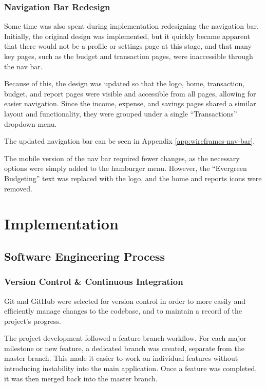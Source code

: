 \documentclass{l4proj}
\begin{document}
\subsection{Navigation Bar Redesign}
Some time was also spent during implementation redesigning the navigation bar. Initially, the original design was implemented, but it quickly became apparent that there would not be a profile or settings page at this stage, and that many key pages, such as the budget and transaction pages, were inaccessible through the nav bar.

Because of this, the design was updated so that the logo, home, transaction, budget, and report pages were visible and accessible from all pages, allowing for easier navigation. Since the income, expense, and savings pages shared a similar layout and functionality, they were grouped under a single “Transactions” dropdown menu.

The updated navigation bar can be seen in Appendix \ref{app:wireframes-nav-bar}.

The mobile version of the nav bar required fewer changes, as the necessary options were simply added to the hamburger menu. However, the “Evergreen Budgeting” text was replaced with the logo, and the home and reports icons were removed.



\chapter{Implementation}
\section{Software Engineering Process}
\subsection{Version Control \& Continuous Integration}

Git and GitHub were selected for version control in order to more easily and efficiently manage changes to the codebase, and to maintain a record of the project's progress.

The project development followed a feature branch workflow. For each major milestone or new feature, a dedicated branch was created, separate from the master branch. This made it easier to work on individual features without introducing instability into the main application. Once a feature was completed, it was then merged back into the master branch.
\end{document}
